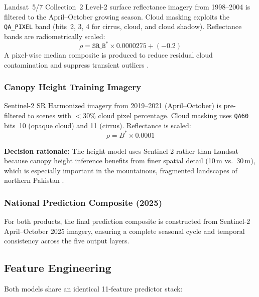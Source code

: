 \documentclass[12pt,a4paper,twoside]{article}
\begin{document}
Landsat~5/7 Collection~2 Level-2 surface reflectance imagery from 1998--2004 is
filtered to the April--October growing season.  Cloud masking exploits the
\texttt{QA\_PIXEL} band (bits~2, 3, 4 for cirrus, cloud, and cloud shadow).
Reflectance bands are radiometrically scaled:
\begin{equation}
  \rho = \texttt{SR\_B}^{*} \times 0.0000275 + (-0.2)
  \label{eq:landsat_scaling}
\end{equation}
A pixel-wise median composite is produced to reduce residual cloud contamination
and suppress transient outliers \citep{Gorelick2017}.

\subsubsection{Canopy Height Training Imagery}

Sentinel-2 SR Harmonized imagery from 2019--2021 (April--October) is pre-filtered
to scenes with $<$30\% cloud pixel percentage.  Cloud masking uses \texttt{QA60}
bits~10 (opaque cloud) and 11 (cirrus).  Reflectance is scaled:
\begin{equation}
  \rho = B^{*} \times 0.0001
  \label{eq:s2_scaling}
\end{equation}

\textbf{Decision rationale:} The height model uses Sentinel-2 rather than Landsat
because canopy height inference benefits from finer spatial detail (10\,m vs.\
30\,m), which is especially important in the mountainous, fragmented landscapes of
northern Pakistan \citep{Belgiu2016,Lang2023}.

\subsubsection{National Prediction Composite (2025)}

For both products, the final prediction composite is constructed from Sentinel-2
April--October 2025 imagery, ensuring a complete seasonal cycle and temporal
consistency across the five output layers.

\subsection{Feature Engineering}\label{sec:features}

Both models share an identical 11-feature predictor stack:
\end{document}
